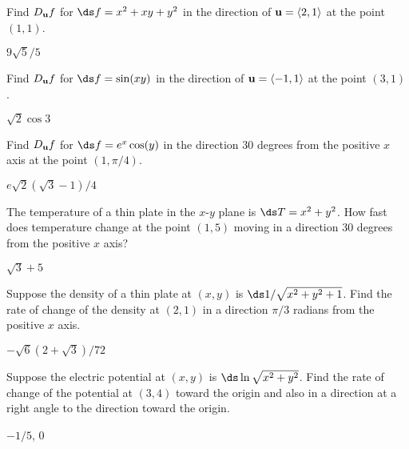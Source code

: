\begin{enumialphparenastyle}

\begin{ex}
Find $D_{\bf u} f$ for 
$\ds f=x^2+xy+y^2$ in the direction of ${\bf u}=\langle 2,1\rangle$ 
at the point $(1,1)$.
\begin{sol}
$9\sqrt5/5$
\end{sol}
\end{ex}

\begin{ex}
Find $D_{\bf u} f$ for 
$\ds f=\sin(xy)$ in the direction of ${\bf u}=\langle -1,1\rangle$ 
at the point $(3,1)$.
\begin{sol}
$\sqrt2\cos3$
\end{sol}
\end{ex}

\begin{ex}
Find $D_{\bf u} f$ for 
$\ds f=e^x\cos(y)$ in the direction 30 degrees from the positive $x$ axis
at the point $(1,\pi/4)$.
\begin{sol}
$e\sqrt2(\sqrt3-1)/4$
\end{sol}
\end{ex}

\begin{ex}
The temperature of a thin plate in the $x$-$y$ plane is 
$\ds T=x^2+y^2$. How fast does temperature change at the point $(1,5)$
moving in a direction 30 degrees from the positive $x$ axis?
\begin{sol}
$\sqrt3+5$
\end{sol}
\end{ex}

\begin{ex}
Suppose the density of a thin plate at $(x,y)$ is
$\ds 1/\sqrt{x^2+y^2+1}$. Find the rate of change of the density at
$(2,1)$ in a direction $\pi/3$ radians from the positive $x$ axis.
\begin{sol}
$-\sqrt6(2+\sqrt3)/72$
\end{sol}
\end{ex}

\begin{ex}
Suppose the electric potential at $(x,y)$ is
$\ds\ln\sqrt{x^2+y^2}$. Find the rate of change of the potential at
$(3,4)$ toward the origin and also in a direction at a right angle to
the direction toward the origin.
\begin{sol}
$-1/5$, $0$
\end{sol}
\end{ex}


\end{enumialphparenastyle}
